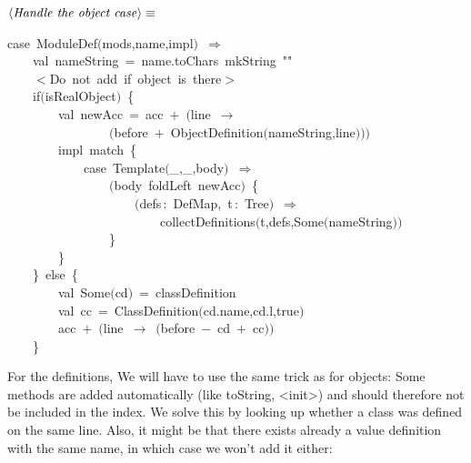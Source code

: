 \documentclass[a4paper,12pt]{article}
\begin{document}
$\left<\mbox{\emph{Handle the object case}}\right>\equiv$
\begin{program}{\vem case}~ModuleDef$($mods,name,impl$)$~$\Rightarrow$
\\~~~~{\vem val}~nameString~=~name.toChars~mkString~""
\\~~~~$<$Do~not~add~{\vem if}~{\vem object}~is~there$>$
\\~~~~{\vem if}$($isRealObject$)$~{\small\{}
\\~~~~~~~~{\vem val}~newAcc~=~acc~$+$~$($line~$\rightarrow$
\\~~~~~~~~~~~~~~~~$($before~$+$~ObjectDefinition$($nameString,line$)$$)$$)$
\\~~~~~~~~impl~{\vem match}~{\small\{}
\\~~~~~~~~~~~~{\vem case}~Template$($\_,\_,body$)$~$\Rightarrow$
\\~~~~~~~~~~~~~~~~$($body~foldLeft~newAcc$)$~{\small\{}
\\~~~~~~~~~~~~~~~~~~~~$($defs\,{\rm :}~DefMap,~t\,{\rm :}~Tree$)$~$\Rightarrow$
\\~~~~~~~~~~~~~~~~~~~~~~~~collectDefinitions$($t,defs,Some$($nameString$)$$)$
\\~~~~~~~~~~~~~~~~{\small\}}
\\~~~~~~~~{\small\}}
\\~~~~{\small\}}~{\vem else}~{\small\{}
\\~~~~~~~~{\vem val}~Some$($cd$)$~=~classDefinition
\\~~~~~~~~{\vem val}~cc~=~ClassDefinition$($cd.name,cd.l,{\vem true}$)$
\\~~~~~~~~acc~$+$~$($line~$\rightarrow$~$($before~$-$~cd~$+$~cc$)$$)$
\\~~~~{\small\}}
\\[0.5em]\end{program}
For the definitions, We will have to use the same trick as for objects: Some
methods are added automatically (like toString, <init>) and should therefore not
be included in the index. We solve this by looking up whether a class was defined
on the same line. Also, it might be that there exists already a value definition with
the same name, in which case we won't add it either:
\end{document}
